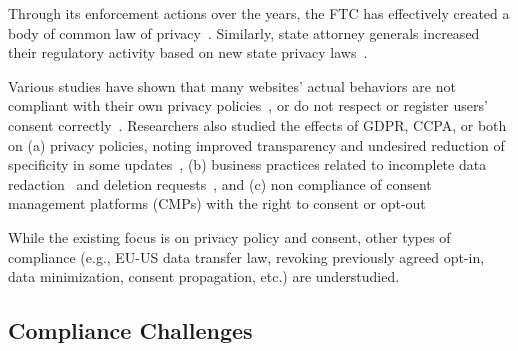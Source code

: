  Through its enforcement actions over the years, the FTC has effectively created a body of common law of privacy~\cite{soloveFTCNewCommon2013}.  
%
Similarly, state attorney generals increased their regulatory activity based on new state privacy laws~\cite{azizJohnnyStillCant2024}.


 Various studies have shown that many websites' actual behaviors are not compliant with their own privacy policies~\cite{libertAutomatedApproachAuditing2018,ouViopolicyDetectorAutomatedApproach2022,manandharAutomatedRegulationAnalysis2024}, or do not respect or register users’ %
consent correctly~\cite{carpinetoAutomaticAssessmentWebsite2016,sanchezrolaCanIOptOutYet2019,matteCookieBannersRespect2020,mehrnezhadCrossPlatformEvaluationPrivacy2020,bouhoulaAutomatedLargeScaleAnalysis2024,vannortwickSettingBarLow2022,birrellSoKTechnicalImplementation2024,Kanc-etal-25-PETs,liuOptedOutTracked2024}.
% 
% 
Researchers also studied the effects of GDPR, CCPA, or both on (a) privacy policies, noting improved transparency and undesired reduction of specificity in some updates~\cite{lindenPrivacyPolicyLandscape2020,hosseiniBilingualLongitudinalAnalysis2024,cuiUnderstandingPrivacyNorms2025}, (b) business practices related to incomplete data redaction~\cite{luWHOISWHOWASLargeScale2021} and deletion requests~\cite{ruppLeaveNoData2022,dimartinoRevisitingIdentificationIssues2022,mehrnezhadHowCanWould2022,jordanVICEROYGDPRCCPAcompliant2023}, and (c) non compliance of consent management platforms (CMPs) with the right to consent or opt-out~\cite{azizJohnnyStillCant2024,papadogiannakisUserTrackingPostcookie2021,bollingerAutomatingCookieConsent2022,tothDarkPatternsManipulation2022,biselliSupportingInformedChoices2024}


\begin{opbox}
While the existing focus is on privacy policy and consent, other types of compliance (e.g., EU-US data transfer law, revoking previously agreed opt-in, data minimization, consent propagation, etc.) are understudied.
\end{opbox}

\subsection{Compliance Challenges}

